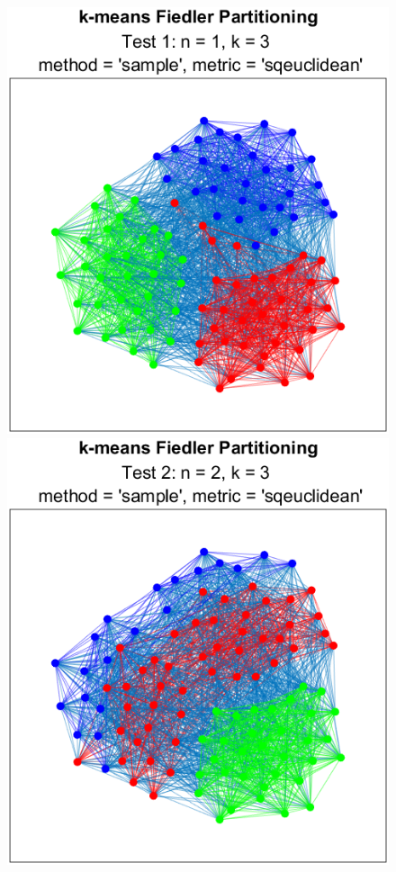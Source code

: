 \documentclass[11pt, letterpaper]{article}
\theoremstyle{perchance}
\begin{document}
    \begin{figure}[h!]
        \centering
        \begin{minipage}{.35\textwidth}
          \centering
          \includegraphics[width=0.95\linewidth]{images/kmeans1.png}
        \end{minipage}%
        \begin{minipage}{.35\textwidth}
          \centering
          \includegraphics[width=0.95\linewidth]{images/kmeans2.png}
        \end{minipage}
    \end{figure}
\end{document}
